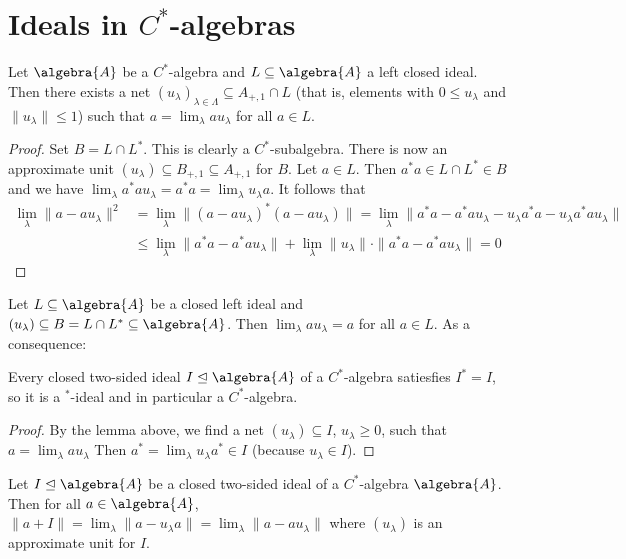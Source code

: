 \documentclass[a4paper]{article}
\begin{document}
\section{Ideals in $C^*$-algebras}

\begin{theorem}
	Let $\algebra{A}$ be a $C^*$-algebra and $L \subseteq \algebra{A}$ a left closed ideal. 
	Then there exists a net $(u_\lambda)_{\lambda \in \Lambda} \subseteq A_{+, 1} \cap L$ (that is, elements with $0 \leq u_\lambda$ and $\|u_\lambda\| \leq 1$) such that $a = \lim_\lambda a u_\lambda$ for all $a \in L$.
\end{theorem}

\begin{proof}
	Set $B = L \cap L^*$.
	This is clearly a $C^*$-subalgebra.
	There is now an approximate unit $(u_\lambda) \subseteq B_{+,1} \subseteq A_{+,1}$ for $B$.
	Let $a \in L$.
	Then $a^* a \in L \cap L^* \in B$ and we have $\lim_\lambda a^* a u_\lambda = a^* a = \lim_\lambda u_\lambda a$.
	It follows that
	\begin{align*}
		\lim_\lambda \|a - a u_\lambda\|^2 &= \lim_\lambda \|(a - a u_\lambda)^* (a - a u_\lambda)\| = \lim_\lambda \|a^* a - a^* a u_\lambda - u_\lambda a^* a - u_\lambda a^* a u_\lambda\|\\
		&\leq \lim_\lambda \| a^* a - a^* a u_\lambda \| + \lim_\lambda \|u_\lambda\| \cdot \| a^* a - a^* a u_\lambda\| = 0
	\end{align*}
\end{proof}

Let $L \subseteq \algebra{A}$ be a closed left ideal and $(u_\lambda) \subseteq B = L \cap L^* \subseteq \algebra{A}$. Then $\lim_\lambda a u_\lambda = a$ for all $a \in L$.
As a consequence:

\begin{theorem}
	Every closed two-sided ideal $I \trianglelefteq \algebra{A}$ of a $C^*$-algebra satiesfies $I^* = I$, so it is a $^*$-ideal and in particular a $C^*$-algebra.
\end{theorem}

\begin{proof}
	By the lemma above, we find a net $(u_\lambda) \subseteq I$, $u_\lambda \geq 0$, such that $a = \lim_\lambda a u_\lambda$
	Then $a^* = \lim_\lambda u_\lambda a^* \in I$ (because $u_\lambda \in I$).
\end{proof}

\begin{corollary}
	Let $I \trianglelefteq \algebra{A}$ be a closed two-sided ideal of a $C^*$-algebra $\algebra{A}$.
	Then for all $a \in \algebra{A}$, $\|a + I \| = \lim_\lambda \|a - u_\lambda a\| = \lim_\lambda \|a - a u_\lambda\|$ where $(u_\lambda)$ is an approximate unit for $I$.
\end{corollary}
\end{document}
